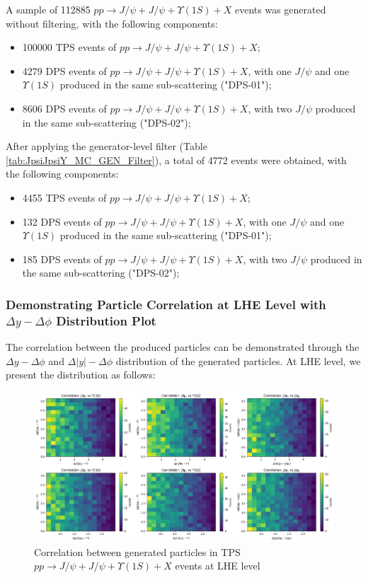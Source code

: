 \documentclass[10pt,twocolumn]{article}
\begin{document}
A sample of 112885 $pp\to J/\psi+J/\psi+\Upsilon(1S)+X$ events was generated without filtering, with the following components:

\begin{itemize}
    \item 100000 TPS events of $pp\to J/\psi+J/\psi+\Upsilon(1S)+X$;
    \item 4279 DPS events of $pp\to J/\psi+J/\psi+\Upsilon(1S)+X$, with one $J/\psi$ and one $\Upsilon(1S)$ produced in the same sub-scattering ("DPS-01");
    \item 8606 DPS events of $pp\to J/\psi+J/\psi+\Upsilon(1S)+X$, with two $J/\psi$ produced in the same sub-scattering ("DPS-02");
\end{itemize}

After applying the generator-level filter (Table \ref{tab:JpsiJpsiY_MC_GEN_Filter}), a total of 4772 events were obtained, with the following components:

\begin{itemize}
    \item 4455 TPS events of $pp\to J/\psi+J/\psi+\Upsilon(1S)+X$;
    \item 132 DPS events of $pp\to J/\psi+J/\psi+\Upsilon(1S)+X$, with one $J/\psi$ and one $\Upsilon(1S)$ produced in the same sub-scattering ("DPS-01");
    \item 185 DPS events of $pp\to J/\psi+J/\psi+\Upsilon(1S)+X$, with two $J/\psi$ produced in the same sub-scattering ("DPS-02");
\end{itemize}

\subsubsection{Demonstrating Particle Correlation at LHE Level with $\Delta y - \Delta \phi$ Distribution Plot}

The correlation between the produced particles can be demonstrated through the $\Delta y - \Delta \phi$ and $\Delta |y| - \Delta \phi$ distribution of the generated particles. At LHE level, we present the distribution as follows:

\begin{figure}
    \centering
    \includegraphics[width=1.0\linewidth]{images/yabs_LHE_LEVEL_TPS_JJY1S_correlation_filtered_p2.png}
    \caption{Correlation between generated particles in TPS $pp\to J/\psi+J/\psi+\Upsilon(1S)+X$ events at LHE level}
    \label{fig:TPS_JJY1S_filtered_correlation_LHE}
\end{figure}
\end{document}
